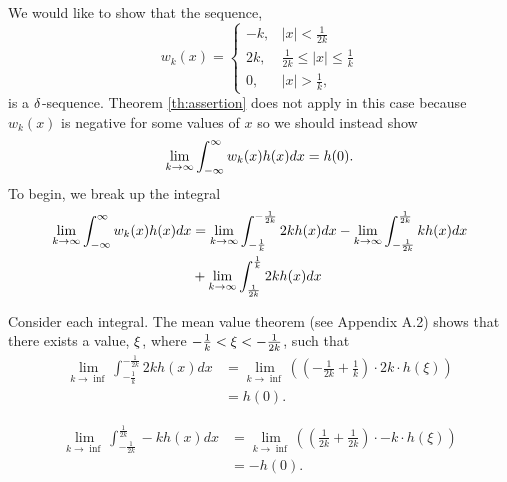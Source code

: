\begin{example}
    We would like to show that the sequence,
    \begin{equation}
        w_k(x) = \begin{cases}
            -k, &|x|<\frac{1}{2k}\\
            2k, &\frac{1}{2k} \leq |x| \leq \frac{1}{k}\\
            0, &|x|> \frac{1}{k},
        \end{cases}
    \end{equation}
    is a \(\delta\)-sequence. Theorem \ref{th:assertion} does not apply in this case because \(w_k(x)\) is negative for some values of \(x\) so we should instead show 
    \begin{equation}
        \lim_{k\to \infty}\int_{-\infty}^{\infty} w_k(x) h(x) dx = h(0).
    \end{equation}
    To begin, we break up the integral 
    \begin{equation}
        \begin{split}
            \lim_{k\to \infty}\int_{-\infty}^{\infty} w_k(x) h(x) dx &= \lim_{k\to \infty}\int_{-\frac{1}{k}}^{-\frac{1}{2k}} 2kh(x)dx - \lim_{k\to \infty}\int_{-\frac{1}{2k}}^{\frac{1}{2k}} kh(x)dx \\
            &+ \lim_{k\to \infty}\int_{\frac{1}{2k}}^{\frac{1}{k}} 2kh(x)dx
        \end{split}
    \end{equation}
    
    Consider each integral. The mean value theorem (see Appendix A.2) shows that there exists a value, \(\xi\), where \(-\frac1k < \xi < -\frac{1}{2k}\), such that
    \begin{equation*}
        \begin{split}
            \lim_{k\to \inf}\int_{-\frac{1}{k}}^{-\frac{1}{2k}} 2kh(x)dx &= \lim_{k\to \inf}  \left( \left(-\frac{1}{2k} + \frac{1}{k}\right) 
            \cdot 2k\cdot h(\xi)\right) \\
            &=h(0).
        \end{split}
    \end{equation*}

    \begin{equation*}
        \begin{split}
            \lim_{k\to \inf}\int_{-\frac{1}{2k}}^{\frac{1}{2k}} -kh(x)dx &= \lim_{k\to \inf}  \left( \left(\frac{1}{2k} + \frac{1}{2k}\right) 
            \cdot -k\cdot h(\xi)\right) \\
            &=-h(0).
        \end{split}
    \end{equation*}


\end{example}
